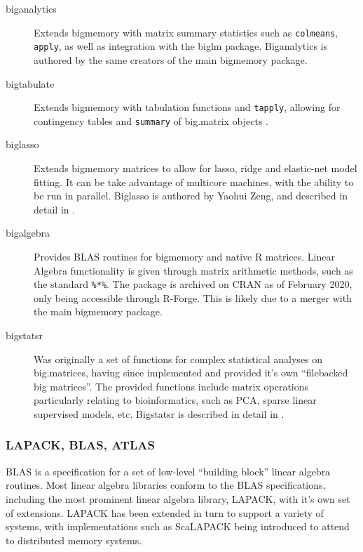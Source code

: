 \begin{description}

    \item[biganalytics]
        Extends bigmemory with matrix summary statistics such as
        \texttt{colmeans}, \texttt{apply}, as well as integration with the biglm
        package\cite{emerson16}. Biganalytics is authored by the same creators
        of the main bigmemory package.
    \item[bigtabulate]
        Extends bigmemory with tabulation functions and \texttt{tapply},
        allowing for contingency tables and \texttt{summary} of big.matrix
        objects \cite{kane16}.
    \item[biglasso]
        Extends bigmemory matrices to allow for lasso, ridge and elastic-net
        model fitting. It can be take advantage of multicore machines, with the
        ability to be run in parallel. Biglasso is authored by Yaohui Zeng, and
        described in detail in \cite{zeng2017biglasso}.
    \item[bigalgebra]
        Provides BLAS routines for bigmemory and native R matrices. Linear
        Algebra functionality is given through matrix arithmetic methods, such
        as the standard \texttt{\%*\%}. The package is archived
        on CRAN as of February 2020, only being accessible through R-Forge. This
        is likely due to a merger with the main bigmemory package.
    \item[bigstatsr]
        Was originally a set of functions for complex statistical analyses on
        big.matrices, having since implemented and provided it's own
        ``filebacked big matrices''\cite{prive2018efficient}. The provided
        functions include matrix operations particularly relating to
        bioinformatics, such as PCA, sparse linear supervised models, etc.
        Bigstatsr is described in detail in \cite{prive2018efficient}.
\end{description}

\hypertarget{sec:blas-lapack}{%
    \subsubsection{LAPACK, BLAS, ATLAS}\label{sec:blas-lapack}}

BLAS is a specification for a set of low-level ``building block'' linear
algebra routines\cite{lawson1979basic}. Most linear algebra libraries
conform to the BLAS specifications, including the most prominent linear
algebra library, LAPACK, with it's own set of
extensions\cite{demmel1989lapack}. LAPACK has been extended in turn to
support a variety of systems, with implementations such as ScaLAPACK
being introduced to attend to distributed memory
systems\cite{choi1992scalapack}.

